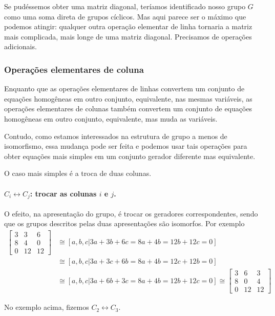 	\par\vspace{0.3cm} Se pudéssemos obter uma matriz diagonal, teríamos identificado nosso grupo $G$ como uma soma direta de grupos cíclicos. Mas aqui parece ser o máximo que podemos atingir: qualquer outra operação elementar de linha tornaria a matriz mais complicada, mais longe de uma matriz diagonal. Precisamos de operações adicionais.
	
	\subsubsection{Operações elementares de coluna}
	\hspace{12pt} Enquanto que as operações elementares de linhas convertem um conjunto de equações homogêneas em outro conjunto, equivalente, nas mesmas variáveis, as operações elementares de colunas também convertem um conjunto de  equações homogêneas em outro conjunto, equivalente, mas muda as variáveis.
	\par\vspace{0.3cm} Contudo, como estamos interessados na estrutura de grupo a menos de isomorfismo, essa mudança pode ser feita e podemos usar tais operações para obter equações mais simples em um conjunto gerador diferente mas equivalente.
	\par\vspace{0.3cm} O caso mais simples é a troca de duas colunas. 
	\paragraph{$C_i\leftrightarrow C_j$: trocar as colunas $i$ e $j$.} O efeito, na apresentação do grupo, é trocar os geradores correspondentes, sendo que os grupos descritos pelas duas apresentações são isomorfos. Por exemplo
	\begin{align*}
	\begin{bmatrix}
	3 & 3 & 6 \\
	8 & 4 & 0 \\
	0 & 12 & 12
	\end{bmatrix} &\cong [ a,b,c \vert 3a+3b+6c=8a+4b=12b+12c=0 ] \\ &\cong [ a,b,c \vert 3a+3c+6b=8a+4b=12c+12b=0 ] \\ &\cong [ a,b,c \vert 3a+6b+3c=8a+4b=12b+12c=0 ] \cong \begin{bmatrix}
	3 & 6 & 3 \\
	8 & 0 & 4 \\
	0 & 12 & 12
	\end{bmatrix}
	\end{align*}
	\par\vspace{0.3cm} No exemplo acima, fizemos $C_2\leftrightarrow C_3$.
